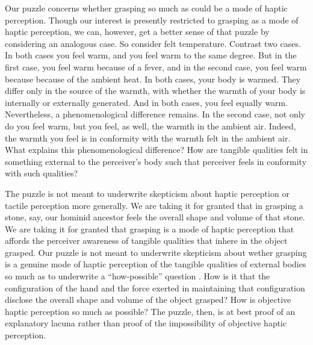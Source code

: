 \documentclass[12pt]{article}
\begin{document}
Our puzzle concerns whether grasping so much as could be a mode of haptic perception. Though our interest is presently restricted to grasping as a mode of haptic perception, we can, however, get a better sense of that puzzle by considering an analogous case. So consider felt temperature. Contrast two cases. In both cases you feel warm, and you feel warm to the same degree. But in the first case, you feel warm because of a fever, and in the second case, you feel warm because because of the ambient heat. In both cases, your body is warmed. They differ only in the source of the warmth, with whether the warmth of your body is internally or externally generated. And in both cases, you feel equally warm. Nevertheless, a phenomenological difference remains. In the second case, not only do you feel warm, but you feel, as well, the warmth in the ambient air. Indeed, the warmth you feel is in conformity with the warmth felt in the ambient air. What explains this phenomenological difference? How are tangible qualities felt in something external to the perceiver's body such that perceiver feels in conformity with such qualities?

The puzzle is not meant to underwrite skepticism about haptic perception or tactile perception more generally. We are taking it for granted that in grasping a stone, say, our hominid ancestor feels the overall shape and volume of that stone. We are taking it for granted that grasping is a mode of haptic perception that affords the perceiver awareness of tangible qualities that inhere in the object grasped. Our puzzle is not meant to underwrite skepticism about wether grasping is a genuine mode of haptic perception of the tangible qualities of external bodies so much as to underwrite a ``how-possible'' question \citep{Cassam:2007lq}. How is it that the configuration of the hand and the force exerted in maintaining that configuration disclose the overall shape and volume of the object grasped? How is objective haptic perception so much as possible? The puzzle, then, is at best proof of an explanatory lacuna rather than proof of the impossibility of objective haptic perception.
\end{document}
